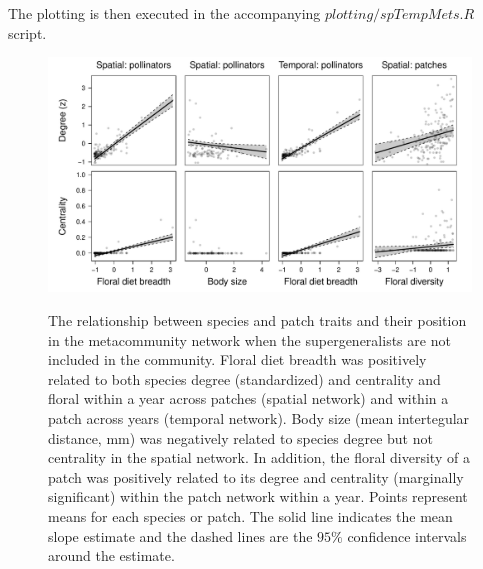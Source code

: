 \documentclass{article}\usepackage[]{graphicx}\usepackage[]{color}
\begin{document}
The plotting is then executed in the accompanying
$plotting/spTempMets.R$ script.

\clearpage

\begin{figure}
\centering
\includegraphics[width=1\textwidth]{figure/all_sig_drop_li_htFALSE.pdf}
\label{fig:connectivity}
\caption{The relationship between species and patch traits and their
position in the metacommunity network when the supergeneralists
are not included in the community. Floral diet breadth was positively related to both species degree (standardized) and centrality and floral within a year across patches (spatial network) and within a patch across years (temporal network). Body size (mean intertegular distance, mm) was negatively related to species degree but not centrality in the spatial network.  In addition, the floral diversity of a patch was positively  related to its degree and centrality (marginally significant) within the patch network within a year. Points represent means for each species or patch. The solid line indicates the mean slope estimate and the dashed lines are the $95\%$ confidence intervals around the estimate.}
\end{figure}
\clearpage
\end{document}
